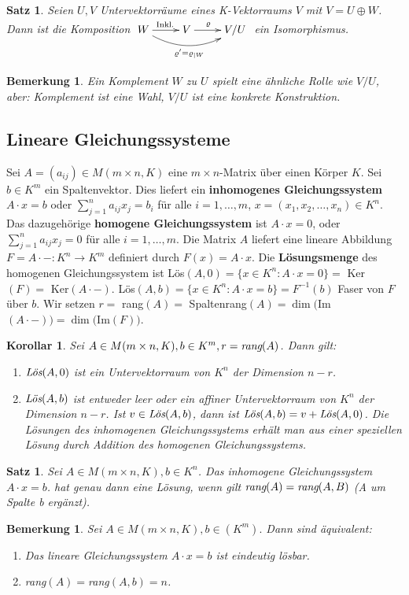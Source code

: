 \documentclass[12pt,a4paper]{article}
\theoremstyle{plain}
\newtheorem{Satz}[Theorem]{Satz}
\newtheorem{Korollar}[Theorem]{Korollar}
\newtheorem{Bemerkung}[Theorem]{Bemerkung}
\numberwithin{equation}{section}
\begin{document}
\begin{Satz}
Seien $U,V$ Untervektorräume eines K-Vektorraums $V$ mit $V=U\oplus W$. Dann ist die Komposition $ \begin{xy}
\xymatrix{
	W \ar[r]^{\text{Inkl.}} \ar@/_ 0.5cm/[rr]_{\varrho'=\varrho_{|W}} & V \ar[r]^/-0.25em/\varrho & V/U
}
\end{xy} $ ein Isomorphismus.
\end{Satz}
\begin{Bemerkung}
Ein Komplement $W$ zu $U$ spielt eine ähnliche Rolle wie $V/U$, aber: Komplement ist eine Wahl, $V/U$ ist eine konkrete Konstruktion.
\end{Bemerkung}
\subsection{Lineare Gleichungssysteme}
Sei $A=(a_{ij})\in M(m\times n,K)$ eine $m\times n$-Matrix über einen Körper $K$. Sei $b\in K^m$ ein Spaltenvektor. Dies liefert ein \textbf{inhomogenes Gleichungssystem} $A\cdot x=b$ oder $\sum_{j=1}^n {a_{ij}x_j}=b_i$ für alle $i=1,\ldots,m$, $x=(x_1,x_2,\ldots,x_n) \in K^n$. Das dazugehörige \textbf{homogene Gleichungssystem} ist $A\cdot x=0$, oder $\sum_{j=1}^n{a_{ij}x_j}=0$ für alle $i=1,\ldots,m$. Die Matrix $A$ liefert eine lineare Abbildung $F=A\cdot -: K^n \rightarrow K^m$ definiert durch $F(x)=A\cdot x$. Die \textbf{Lösungsmenge} des homogenen Gleichungssystem ist Lös$(A,0)=\{x\in K^n:A\cdot x=0\}=$ Ker$(F)=$ Ker$(A\cdot -)$. Lös$(A,b)=\{x\in K^n:A\cdot x=b\}=F^{-1}(b)$ Faser von $F$ über $b$. Wir setzen $r=$ rang$(A)=$ Spaltenrang$(A)=\dim($Im$(A\cdot -))=\dim($Im$(F))$.
\begin{Korollar}
Sei $A\in M(m\times n,K), b\in K^m, r=\emph{rang}(A)$. Dann gilt: \begin{enumerate}
\renewcommand{\labelenumi}{\emph{\alph{enumi})}}
\item $\emph{Lös}(A,0)$ ist ein Untervektorraum von $K^n$ der Dimension $n-r$.
\item $\emph{Lös}(A,b)$ ist entweder leer oder ein affiner Untervektorraum von $K^n$ der Dimension $n-r$. Ist $v\in \emph{Lös}(A,b)$, dann ist $\emph{Lös}(A,b)=v+\emph{Lös}(A,0)$. \glqq Die Lösungen des inhomogenen Gleichungssystems erhält man aus einer speziellen Lösung durch Addition des homogenen Gleichungssystems\grqq.
\end{enumerate}
\end{Korollar}
\begin{Satz}
Sei $A\in M(m\times n,K), b\in K^n$. Das inhomogene Gleichungssystem $A\cdot x=b$. hat genau dann eine Lösung, wenn gilt $\emph{rang}(A)=\emph{rang}(A,B)$ (A um Spalte b ergänzt).
\end{Satz}
\begin{Bemerkung}
Sei $A\in M(m\times n, K),b\in (K^m).$ Dann sind äquivalent: \begin{enumerate}
\renewcommand{\labelenumi}{(\roman{enumi})}
\item Das lineare Gleichungssystem $A\cdot x=b$ ist eindeutig lösbar.
\item rang$(A)=$rang$(A,b)=n$.
\end{enumerate}
\end{Bemerkung}
\end{document}
